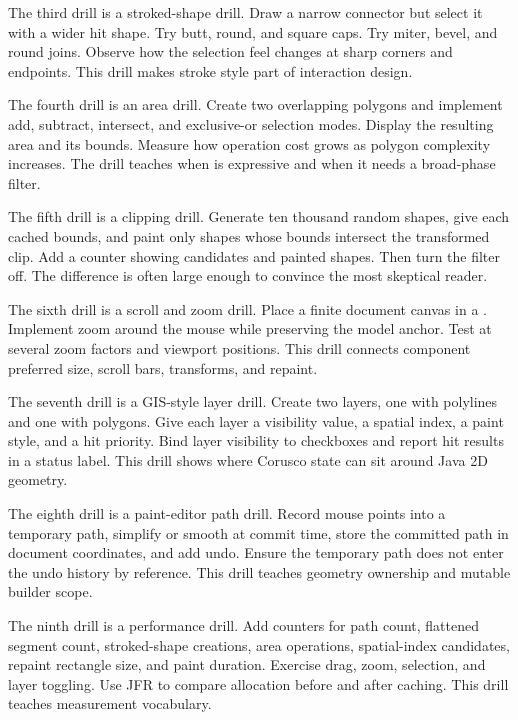 The third drill is a stroked-shape drill. Draw a narrow connector but select it with a wider  hit shape. Try butt, round, and square caps. Try miter, bevel, and round joins. Observe how the selection feel changes at sharp corners and endpoints. This drill makes stroke style part of interaction design.

The fourth drill is an area drill. Create two overlapping polygons and implement add, subtract, intersect, and exclusive-or selection modes. Display the resulting area and its bounds. Measure how operation cost grows as polygon complexity increases. The drill teaches when  is expressive and when it needs a broad-phase filter.

The fifth drill is a clipping drill. Generate ten thousand random shapes, give each cached bounds, and paint only shapes whose bounds intersect the transformed clip. Add a counter showing candidates and painted shapes. Then turn the filter off. The difference is often large enough to convince the most skeptical reader.

The sixth drill is a scroll and zoom drill. Place a finite document canvas in a . Implement zoom around the mouse while preserving the model anchor. Test at several zoom factors and viewport positions. This drill connects component preferred size, scroll bars, transforms, and repaint.

The seventh drill is a GIS-style layer drill. Create two layers, one with polylines and one with polygons. Give each layer a visibility value, a spatial index, a paint style, and a hit priority. Bind layer visibility to checkboxes and report hit results in a status label. This drill shows where Corusco state can sit around Java 2D geometry.

The eighth drill is a paint-editor path drill. Record mouse points into a temporary path, simplify or smooth at commit time, store the committed path in document coordinates, and add undo. Ensure the temporary path does not enter the undo history by reference. This drill teaches geometry ownership and mutable builder scope.

The ninth drill is a performance drill. Add counters for path count, flattened segment count, stroked-shape creations, area operations, spatial-index candidates, repaint rectangle size, and paint duration. Exercise drag, zoom, selection, and layer toggling. Use JFR to compare allocation before and after caching. This drill teaches measurement vocabulary.

